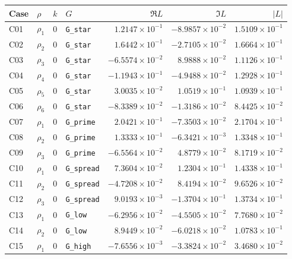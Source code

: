 \documentclass[11pt]{article}
\begin{document}
\begin{center}
\small
\begin{tabular}{llllrrr}
\toprule
Case & \(\rho\) & \(k\) & \(G\) & \(\Re L\) & \(\Im L\) & \(|L|\)\\
\midrule
C01 & \(\rho_1\) & 0 & \texttt{G\_star} & \(1.2147{\times}10^{-1}\) & \(-8.9857{\times}10^{-2}\) & \(1.5109{\times}10^{-1}\)\\
C02 & \(\rho_2\) & 0 & \texttt{G\_star} & \(1.6442{\times}10^{-1}\) & \(-2.7105{\times}10^{-2}\) & \(1.6664{\times}10^{-1}\)\\
C03 & \(\rho_3\) & 0 & \texttt{G\_star} & \(-6.5574{\times}10^{-2}\) & \(8.9888{\times}10^{-2}\) & \(1.1126{\times}10^{-1}\)\\
C04 & \(\rho_4\) & 0 & \texttt{G\_star} & \(-1.1943{\times}10^{-1}\) & \(-4.9488{\times}10^{-2}\) & \(1.2928{\times}10^{-1}\)\\
C05 & \(\rho_5\) & 0 & \texttt{G\_star} & \(3.0035{\times}10^{-2}\) & \(1.0519{\times}10^{-1}\) & \(1.0939{\times}10^{-1}\)\\
C06 & \(\rho_6\) & 0 & \texttt{G\_star} & \(-8.3389{\times}10^{-2}\) & \(-1.3186{\times}10^{-2}\) & \(8.4425{\times}10^{-2}\)\\
C07 & \(\rho_1\) & 0 & \texttt{G\_prime} & \(2.0421{\times}10^{-1}\) & \(-7.3503{\times}10^{-2}\) & \(2.1704{\times}10^{-1}\)\\
C08 & \(\rho_2\) & 0 & \texttt{G\_prime} & \(1.3333{\times}10^{-1}\) & \(-6.3421{\times}10^{-3}\) & \(1.3348{\times}10^{-1}\)\\
C09 & \(\rho_3\) & 0 & \texttt{G\_prime} & \(-6.5564{\times}10^{-2}\) & \(4.8779{\times}10^{-2}\) & \(8.1719{\times}10^{-2}\)\\
C10 & \(\rho_1\) & 0 & \texttt{G\_spread} & \(7.3604{\times}10^{-2}\) & \(1.2304{\times}10^{-1}\) & \(1.4338{\times}10^{-1}\)\\
C11 & \(\rho_2\) & 0 & \texttt{G\_spread} & \(-4.7208{\times}10^{-2}\) & \(8.4194{\times}10^{-2}\) & \(9.6526{\times}10^{-2}\)\\
C12 & \(\rho_3\) & 0 & \texttt{G\_spread} & \(9.0193{\times}10^{-3}\) & \(-1.3704{\times}10^{-1}\) & \(1.3734{\times}10^{-1}\)\\
C13 & \(\rho_1\) & 0 & \texttt{G\_low} & \(-6.2956{\times}10^{-2}\) & \(-4.5505{\times}10^{-2}\) & \(7.7680{\times}10^{-2}\)\\
C14 & \(\rho_2\) & 0 & \texttt{G\_low} & \(8.9449{\times}10^{-2}\) & \(-6.0218{\times}10^{-2}\) & \(1.0783{\times}10^{-1}\)\\
C15 & \(\rho_1\) & 0 & \texttt{G\_high} & \(-7.6556{\times}10^{-3}\) & \(-3.3824{\times}10^{-2}\) & \(3.4680{\times}10^{-2}\)\\

\end{tabular}
\end{center}
\end{document}
